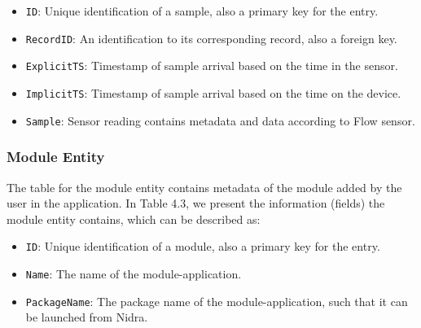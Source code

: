 \begin{itemize}
    \item \verb|ID|: Unique identification of a sample, also a primary key for the entry.
    \item \verb|RecordID|: An identification to its corresponding record, also a foreign key. 
    \item \verb|ExplicitTS|: Timestamp of sample arrival based on the time in the sensor. 
    \item \verb|ImplicitTS|: Timestamp of sample arrival based on the time on the device. 
    \item \verb|Sample|: Sensor reading contains metadata and data according to Flow sensor.
\end{itemize}

\begin{table}[!h]
\begin{center}
\caption{Example entry in sample table}
\end{center}
\end{table}



\subsubsection{Module Entity} \label{ssec:module}
The table for the module entity contains metadata of the module added by the user in the application. In Table 4.3, we present the information (fields) the module entity contains, which can be described as:
\begin{itemize}
    \item \verb|ID|: Unique identification of a module, also a primary key for the entry.
    \item \verb|Name|: The name of the module-application.
    \item \verb|PackageName|: The package name of the module-application, such that it can be launched from Nidra. 
\end{itemize}

\begin{table}[!h]
\begin{center}
\caption{Example entry in module table}
\end{center}
\end{table}


